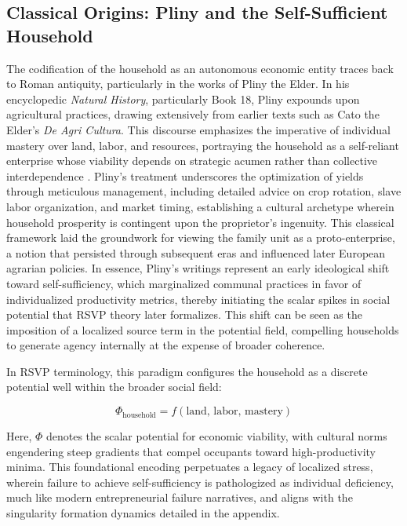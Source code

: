 \documentclass[11pt]{article}
\begin{document}
\subsection{Classical Origins: Pliny and the Self-Sufficient Household}

The codification of the household as an autonomous economic entity traces back to Roman antiquity, particularly in the works of Pliny the Elder. In his encyclopedic \textit{Natural History}, particularly Book 18, Pliny expounds upon agricultural practices, drawing extensively from earlier texts such as Cato the Elder's \textit{De Agri Cultura}. This discourse emphasizes the imperative of individual mastery over land, labor, and resources, portraying the household as a self-reliant enterprise whose viability depends on strategic acumen rather than collective interdependence \citep{pliny77}. Pliny's treatment underscores the optimization of yields through meticulous management, including detailed advice on crop rotation, slave labor organization, and market timing, establishing a cultural archetype wherein household prosperity is contingent upon the proprietor's ingenuity. This classical framework laid the groundwork for viewing the family unit as a proto-enterprise, a notion that persisted through subsequent eras and influenced later European agrarian policies. In essence, Pliny's writings represent an early ideological shift toward self-sufficiency, which marginalized communal practices in favor of individualized productivity metrics, thereby initiating the scalar spikes in social potential that RSVP theory later formalizes. This shift can be seen as the imposition of a localized source term in the potential field, compelling households to generate agency internally at the expense of broader coherence.

In RSVP terminology, this paradigm configures the household as a discrete potential well within the broader social field:

\begin{equation}
\Phi_{\text{household}} = f(\text{land, labor, mastery})
\end{equation}

Here, $\Phi$ denotes the scalar potential for economic viability, with cultural norms engendering steep gradients that compel occupants toward high-productivity minima. This foundational encoding perpetuates a legacy of localized stress, wherein failure to achieve self-sufficiency is pathologized as individual deficiency, much like modern entrepreneurial failure narratives, and aligns with the singularity formation dynamics detailed in the appendix.
\end{document}
